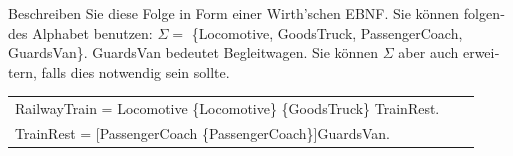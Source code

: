 \documentclass{exam}
\theoremstyle{definition}
\theoremstyle{definition}
\newenvironment{grammar}
	{\begin{tabular}[b]{lcl}}
	{\end{tabular}}
\begin{document}
\begin{questions}
\begin{otherlanguage}{german}
Beschreiben Sie diese Folge in Form einer Wirth'schen EBNF. Sie können folgendes Alphabet benutzen: $\Sigma =$ \{Locomotive, GoodsTruck, PassengerCoach, GuardsVan\}. GuardsVan bedeutet Begleitwagen. Sie können $\Sigma$ aber auch erweitern, falls dies notwendig sein sollte.
\end{otherlanguage}

\begin{solution}

	\begin{grammar}
		RailwayTrain = Locomotive \{Locomotive\} \{GoodsTruck\} TrainRest. \\
		TrainRest = [PassengerCoach \{PassengerCoach\}]GuardsVan.
	\end{grammar}
\end{solution}
\end{questions}
\end{document}

